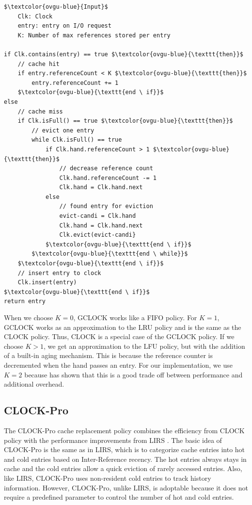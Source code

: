 \documentclass[
	12pt,
	a4paper,
	abstract,
	bibliography=totoc,
	chapterprefix,
	headings=openright,
	numbers=endperiod,
	parskip=half,
	twoside,
]{scrreprt}
\begin{document}
\begin{lstlisting}[mathescape=true,caption={GCLOCK replacement algorithm in pseudocode.},label=lst:gclock-algorithm]
$\textcolor{ovgu-blue}{Input}$
	Clk: Clock
	entry: entry on I/O request
	K: Number of max references stored per entry

if Clk.contains(entry) == true $\textcolor{ovgu-blue}{\texttt{then}}$
	// cache hit
	if entry.referenceCount < K $\textcolor{ovgu-blue}{\texttt{then}}$
		entry.referenceCount += 1
	$\textcolor{ovgu-blue}{\texttt{end \ if}}$
else
	// cache miss
	if Clk.isFull() == true $\textcolor{ovgu-blue}{\texttt{then}}$
		// evict one entry
		while Clk.isFull() == true
			if Clk.hand.referenceCount > 1 $\textcolor{ovgu-blue}{\texttt{then}}$
				// decrease reference count 
				Clk.hand.referenceCount -= 1
				Clk.hand = Clk.hand.next
			else
				// found entry for eviction 
				evict-candi = Clk.hand
				Clk.hand = Clk.hand.next
				Clk.evict(evict-candi}
			$\textcolor{ovgu-blue}{\texttt{end \ if}}$
		$\textcolor{ovgu-blue}{\texttt{end \ while}}$
	$\textcolor{ovgu-blue}{\texttt{end \ if}}$
	// insert entry to clock
	Clk.insert(entry)
$\textcolor{ovgu-blue}{\texttt{end \ if}}$
return entry 
\end{lstlisting}

When we choose $K = 0$, GCLOCK works like a FIFO policy.
For $K = 1$, GCLOCK works as an approximation to the LRU policy and is the same as the CLOCK policy.
Thus, CLOCK is a special case of the GCLOCK policy.
If we choose $K > 1$, we get an approximation to the LFU policy, but with the addition of a built-in aging mechanism.
This is because the reference counter is decremented when the hand passes an entry.
For our implementation, we use $K = 2$ because \cite{corbato1968paging} has shown that this is a good trade off 
between performance and additional overhead.

\subsection{CLOCK-Pro}
\label{sub:clock-pro}

The CLOCK-Pro cache replacement policy \cite{jiang2005clock} combines the efficiency from CLOCK policy 
with the performance improvements from LIRS \cite{10.1145/511399.511340}.
The basic idea of CLOCK-Pro is the same as in LIRS, which is to categorize cache entries into hot and cold entries 
based on Inter-Reference recency.
The hot entries always stays in cache and the cold entries allow a quick eviction of rarely accessed entries.
Also, like LIRS, CLOCK-Pro uses non-resident cold entries to track history information.
However, CLOCK-Pro, unlike LIRS, is adoptable because it does not require a predefined parameter to control the number of hot and cold entries.
\end{document}
